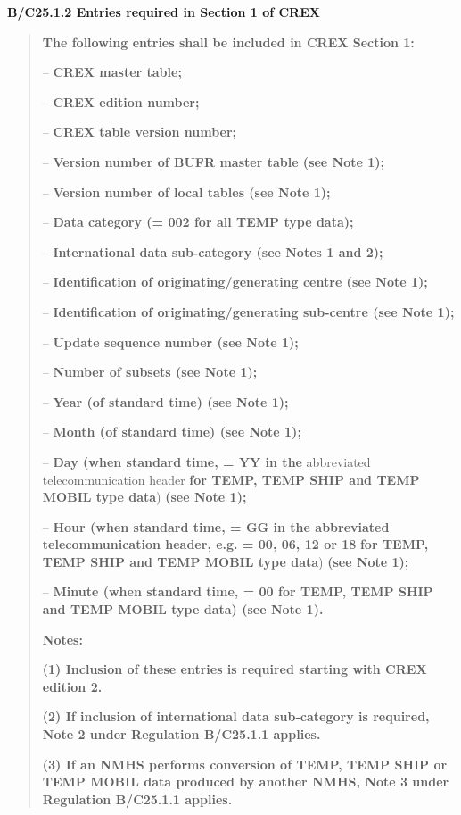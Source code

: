 \textbf{B/C25.1.2 Entries required in Section 1 of CREX}

\begin{quote}
\textbf{The following entries shall be included in CREX Section 1:}

-- \textbf{CREX master table;}

-- \textbf{CREX edition number;}

-- \textbf{CREX table version number;}

-- \textbf{Version number of BUFR master table (see Note 1);}

-- \textbf{Version number of local tables (see Note 1);}

-- \textbf{Data category (= 002 for all TEMP type data);}

-- \textbf{International data sub-category (see Notes 1 and 2);}

-- \textbf{Identification of originating/generating centre (see Note 1);}

-- \textbf{Identification of originating/generating sub-centre (see Note 1);}

-- \textbf{Update sequence number (see Note 1);}

-- \textbf{Number of subsets (see Note 1);}

-- \textbf{Year (of standard time) (see Note 1);}

-- \textbf{Month (of standard time) (see Note 1);}

-- \textbf{Day (when standard time, = YY in the} abbreviated telecommunication header \textbf{for TEMP, TEMP SHIP and TEMP MOBIL type data}) \textbf{(see Note 1);}

-- \textbf{Hour (when standard time, = GG in the abbreviated telecommunication header, e.g. = 00, 06, 12 or 18} \textbf{for TEMP, TEMP SHIP and TEMP MOBIL type data}) \textbf{(see Note 1);}

-- \textbf{Minute (when standard time, = 00 for TEMP, TEMP SHIP and TEMP MOBIL type data) (see Note 1).}

\textbf{Notes:}

\textbf{(1) Inclusion of these entries is required starting with CREX edition 2.}

\textbf{(2) If inclusion of international data sub-category is required, Note 2 under Regulation B/C25.1.1 applies.}

\textbf{(3) If an NMHS performs conversion of TEMP, TEMP SHIP or TEMP MOBIL data produced by another NMHS, Note 3 under Regulation B/C25.1.1 applies.}
\end{quote}

